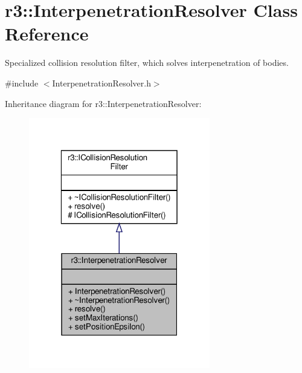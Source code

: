\hypertarget{classr3_1_1_interpenetration_resolver}{}\section{r3\+:\+:Interpenetration\+Resolver Class Reference}
\label{classr3_1_1_interpenetration_resolver}


Specialized collision resolution filter, which solves interpenetration of bodies.  




{\ttfamily \#include $<$Interpenetration\+Resolver.\+h$>$}



Inheritance diagram for r3\+:\+:Interpenetration\+Resolver\+:\nopagebreak
\begin{figure}[H]
\begin{center}
\leavevmode
\includegraphics[width=224pt]{classr3_1_1_interpenetration_resolver__inherit__graph}
\end{center}
\end{figure}



